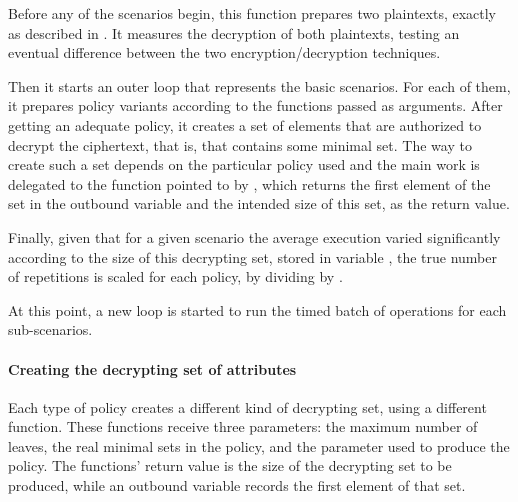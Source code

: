 \documentclass{article}
\begin{document}
Before any of the scenarios begin, this function prepares two plaintexts, exactly as described in . It measures the decryption of both plaintexts, testing an eventual difference between the two encryption/decryption techniques.

Then it starts an outer loop that represents the basic scenarios. For each of them, it prepares policy variants according to the functions passed as arguments. After getting an adequate policy, it creates a set of elements that are authorized to decrypt the ciphertext, that is, that contains some minimal set. The way to create such a set depends on the particular policy used and the main work is delegated to the function pointed to by , which returns the first element of the set in the outbound variable  and the intended size of this set, as the return value.

Finally, given that for a given scenario the average execution varied significantly according to the size of this decrypting set, stored in variable , the true number of repetitions is scaled for each policy, by dividing  by .

At this point, a new loop is started to run the timed batch of operations for each sub-scenarios.

\paragraph{Creating the decrypting set of attributes}

Each type of policy creates a different kind of decrypting set, using a different function. These functions receive three parameters: the maximum number of leaves, the real minimal sets in the policy, and the parameter  used to produce the policy. The functions' return value is the size of the decrypting set to be produced, while an outbound variable records the first element of that set. 
\end{document}
